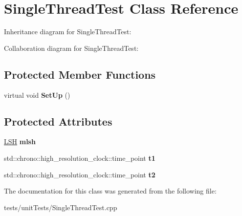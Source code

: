 \hypertarget{classSingleThreadTest}{}\section{Single\+Thread\+Test Class Reference}
\label{classSingleThreadTest}


Inheritance diagram for Single\+Thread\+Test\+:


Collaboration diagram for Single\+Thread\+Test\+:
\subsection*{Protected Member Functions}
\begin{DoxyCompactItemize}
\item 
virtual void {\bfseries Set\+Up} ()\hypertarget{classSingleThreadTest_ad41ea52a0041dae29f8f066f3f9a40bb}{}\label{classSingleThreadTest_ad41ea52a0041dae29f8f066f3f9a40bb}

\end{DoxyCompactItemize}
\subsection*{Protected Attributes}
\begin{DoxyCompactItemize}
\item 
\hyperlink{classLSH}{L\+SH} {\bfseries mlsh}\hypertarget{classSingleThreadTest_acae8b5e99df1640c8a06ac6cb8e76063}{}\label{classSingleThreadTest_acae8b5e99df1640c8a06ac6cb8e76063}

\item 
std\+::chrono\+::high\+\_\+resolution\+\_\+clock\+::time\+\_\+point {\bfseries t1}\hypertarget{classSingleThreadTest_aac1f2468d3f5d9826264768ac00ab740}{}\label{classSingleThreadTest_aac1f2468d3f5d9826264768ac00ab740}

\item 
std\+::chrono\+::high\+\_\+resolution\+\_\+clock\+::time\+\_\+point {\bfseries t2}\hypertarget{classSingleThreadTest_a5891ff7b6c52ba8350c85397c0cff3fa}{}\label{classSingleThreadTest_a5891ff7b6c52ba8350c85397c0cff3fa}

\end{DoxyCompactItemize}


The documentation for this class was generated from the following file\+:\begin{DoxyCompactItemize}
\item 
tests/unit\+Tests/Single\+Thread\+Test.\+cpp\end{DoxyCompactItemize}
